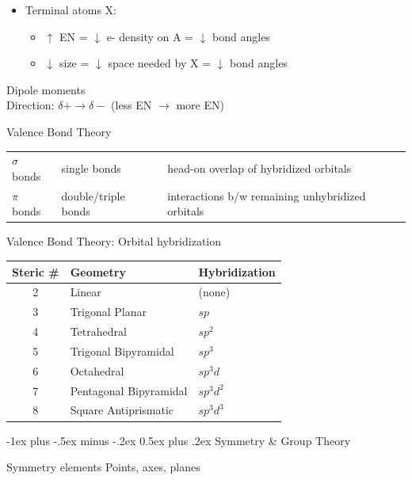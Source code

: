 \documentclass[10pt,landscape]{article}
\makeatletter
\renewcommand{\section}{\@startsection{section}{1}{0mm}%
                                {-1ex plus -.5ex minus -.2ex}%
                                {0.5ex plus .2ex}%
                                {\normalfont\large\bfseries}}
\newcommand{\extraline}{\vspace{1em}}
\newcommand{\tableindent}{\hspace{1.5em}}
\makeatother
\begin{document}
\begin{multicols}{3}
\begin{itemize}
\item Terminal atoms X: 
	\begin{itemize}
		\item $\uparrow$ EN  = $\downarrow$ e- density on A = $\downarrow$ bond angles
		\item $\downarrow$ size = $\downarrow$ space needed by X = $\downarrow$ bond angles
	\end{itemize}
\end{itemize}

Dipole moments \\
\tableindent Direction: $\delta + \rightarrow \delta -$ (less EN $\rightarrow$ more EN) 
\extraline

Valence Bond Theory

\begin{tabular}{@{\tableindent}lp{16mm}p{42mm}@{}}
$\sigma$ bonds & single bonds & head-on overlap of hybridized orbitals \\
$\pi$ bonds & double/triple bonds & interactions b/w  remaining unhybridized orbitals \\
\end{tabular}
\extraline

Valence Bond Theory: Orbital hybridization 
%
\begin{tabular}{@{}cll@{}}
	Steric \# & Geometry & Hybridization \\ \hline
	2 & Linear & (none) \\
	3 & Trigonal Planar 
	& $sp$ \\
	4 & Tetrahedral 
	& $sp^2$ \\
	5 & Trigonal Bipyramidal 
	& $sp^3$ \\
	6 & Octahedral 
	& $sp^3d$ \\
	7 & Pentagonal Bipyramidal & $sp^3d^2$ \\ 
	8 & Square Antiprismatic & $sp^3d^3$ \\
\end{tabular}
\extraline


\hrulefill

\section{Symmetry \& Group Theory}

Symmetry elements
\tableindent Points, axes, planes


\end{multicols}
\end{document}
